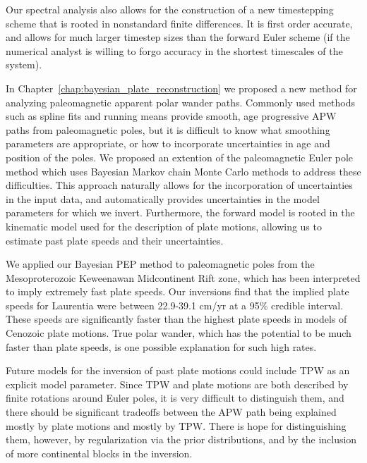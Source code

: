 Our spectral analysis also allows for the construction of a new timestepping
scheme that is rooted in nonstandard finite differences. It is first order accurate,
and allows for much larger timestep sizes than the forward Euler scheme 
(if the numerical analyst is willing to forgo accuracy in the shortest timescales of the system).

In Chapter~\ref{chap:bayesian_plate_reconstruction} we proposed a new method
for analyzing paleomagnetic apparent polar wander paths. Commonly used methods
such as spline fits and running means provide smooth, age progressive APW paths
from paleomagnetic poles, but it is difficult to know what smoothing parameters
are appropriate, or how to incorporate uncertainties in age and position of the poles.
We proposed an extention of the paleomagnetic Euler pole method which uses Bayesian
Markov chain Monte Carlo methods to address these difficulties.
This approach naturally allows for the incorporation of uncertainties in the input data,
and automatically provides uncertainties in the model parameters for which we invert.
Furthermore, the forward model is rooted in the kinematic model used
for the description of plate motions, allowing us to estimate past plate speeds
and their uncertainties.

We applied our Bayesian PEP method to paleomagnetic poles from the 
Mesoproterozoic Keweenawan Midcontinent Rift zone, which has been interpreted to
imply extremely fast plate speeds. Our inversions find that the implied plate
speeds for Laurentia were between 22.9-39.1 cm/yr at a 95\% credible interval.
These speeds are significantly faster than the highest plate speeds in
models of Cenozoic plate motions. True polar wander, which has the potential
to be much faster than plate speeds, is one possible explanation for such high
rates.

Future models for the inversion of past plate motions could include TPW as an
explicit model parameter. Since TPW and plate motions are both described by
finite rotations around Euler poles, it is very difficult to distinguish them,
and there should be significant tradeoffs between the APW path being explained
mostly by plate motions and mostly by TPW. 
There is hope for distinguishing them, however,
by regularization via the prior distributions,
and by the inclusion of more continental blocks in the inversion.

